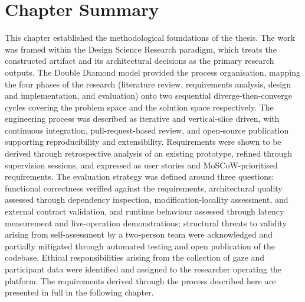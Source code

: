 \section{Chapter Summary}
\label{sec:methodology-summary}

This chapter established the methodological foundations of the thesis.
The work was framed within the Design Science Research paradigm, which treats the constructed artifact and its architectural decisions as the primary research outputs.
The Double Diamond model provided the process organisation, mapping the four phases of the research (literature review, requirements analysis, design and implementation, and evaluation) onto two sequential diverge-then-converge cycles covering the problem space and the solution space respectively.
The engineering process was described as iterative and vertical-slice driven, with continuous integration, pull-request-based review, and open-source publication supporting reproducibility and extensibility.
Requirements were shown to be derived through retrospective analysis of an existing prototype, refined through supervision sessions, and expressed as user stories and MoSCoW-prioritised requirements.
The evaluation strategy was defined around three questions: functional correctness verified against the requirements, architectural quality assessed through dependency inspection, modification-locality assessment, and external contract validation, and runtime behaviour assessed through latency measurement and live-operation demonstrations; structural threats to validity arising from self-assessment by a two-person team were acknowledged and partially mitigated through automated testing and open publication of the codebase.
Ethical responsibilities arising from the collection of gaze and participant data were identified and assigned to the researcher operating the platform.
The requirements derived through the process described here are presented in full in the following chapter.
